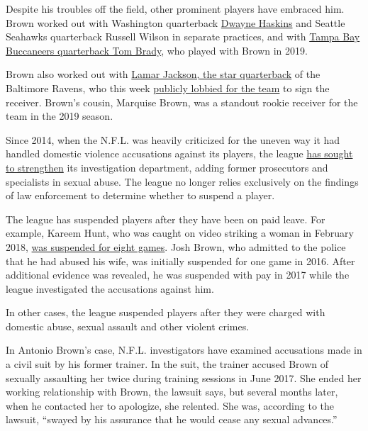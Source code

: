 Despite his troubles off the field, other prominent players have
embraced him. Brown worked out with Washington quarterback
\href{https://www.nbcsports.com/washington/redskins/video-dwayne-haskins-connects-antonio-brown-over-and-over-offseason-workout}{Dwayne
Haskins} and Seattle Seahawks quarterback Russell Wilson in separate
practices, and with
\href{https://sports.yahoo.com/tom-brady-and-antonio-brown-are-working-out-with-deion-sanders-son-181014120.html}{Tampa
Bay Buccaneers quarterback Tom Brady}, who played with Brown in 2019.

Brown also worked out with
\href{https://www.youtube.com/watch?v=pOJtVpB1Vq0}{Lamar Jackson, the
star quarterback} of the Baltimore Ravens, who this week
\href{https://www.espn.com/nfl/story/_/id/29559051/lamar-jackson-says-hoping-ravens-sign-antonio-brown}{publicly
lobbied for the team} to sign the receiver. Brown's cousin, Marquise
Brown, was a standout rookie receiver for the team in the 2019 season.

Since 2014, when the N.F.L. was heavily criticized for the uneven way it
had handled domestic violence accusations against its players, the
league
\href{https://www.nytimes3xbfgragh.onion/2014/08/29/sports/football/roger-goodell-admits-he-was-wrong-and-alters-nfl-policy-on-domestic-violence.html}{has
sought to strengthen} its investigation department, adding former
prosecutors and specialists in sexual abuse. The league no longer relies
exclusively on the findings of law enforcement to determine whether to
suspend a player.

The league has suspended players after they have been on paid leave. For
example, Kareem Hunt, who was caught on video striking a woman in
February 2018,
\href{https://www.nytimes3xbfgragh.onion/2019/03/15/sports/football/kareem-hunt-.html}{was
suspended for eight games}. Josh Brown, who admitted to the police that
he had abused his wife, was initially suspended for one game in 2016.
After additional evidence was revealed, he was suspended with pay in
2017 while the league investigated the accusations against him.

In other cases, the league suspended players after they were charged
with domestic abuse, sexual assault and other violent crimes.

In Antonio Brown's case, N.F.L. investigators have examined accusations
made in a civil suit by his former trainer. In the suit, the trainer
accused Brown of sexually assaulting her twice during training sessions
in June 2017. She ended her working relationship with Brown, the lawsuit
says, but several months later, when he contacted her to apologize, she
relented. She was, according to the lawsuit, ``swayed by his assurance
that he would cease any sexual advances.''

